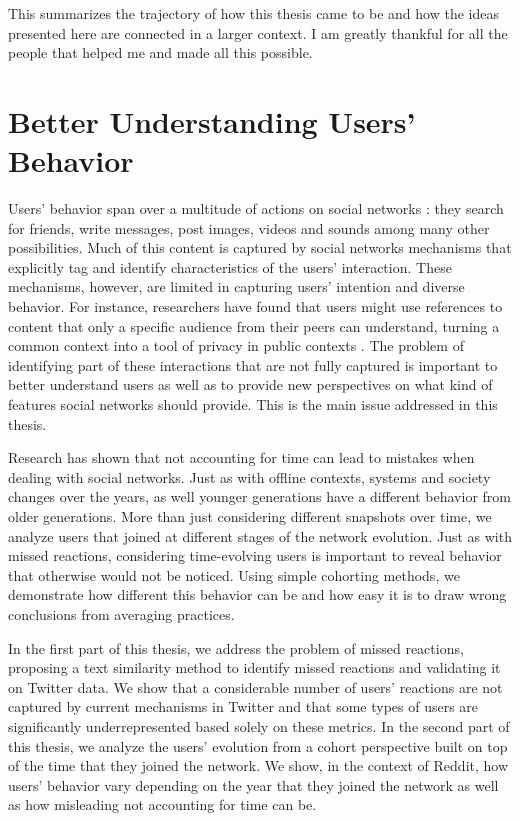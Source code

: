 This summarizes the trajectory of how this thesis came to be and how the ideas presented here are connected in a larger context. I am greatly thankful for all the people that helped me and made all this possible.

\section{Better Understanding Users' Behavior}

Users' behavior span over a multitude of actions on social networks \cite{Benevenuto2009, Gilbert2009, Comarela2012}: they search for friends, write messages, post images, videos and sounds among many other possibilities. Much of this content is captured by social networks mechanisms that explicitly tag and identify characteristics of the users' interaction. These mechanisms, however, are limited in capturing users' intention and diverse behavior. For instance, researchers have found that users might use references to content that only a specific audience from their peers can understand, turning a common context into a tool of privacy in public contexts \cite{Boyd2011}. The problem of identifying part of these interactions that are not fully captured is important to better understand users as well as to provide new perspectives on what kind of features social networks should provide. This is the main issue addressed in this thesis.

Research has shown that not accounting for time can lead to mistakes when dealing with social networks. Just as with offline contexts, systems and society changes over the years, as well younger generations have a different behavior from older generations. More than just considering different snapshots over time, we analyze users that joined at different stages of the network evolution. Just as with missed reactions, considering time-evolving users is important to reveal behavior that otherwise would not be noticed. Using simple cohorting methods, we demonstrate how different this behavior can be and how easy it is to draw wrong conclusions from averaging practices.

In the first part of this thesis, we address the problem of missed reactions, proposing a text similarity method to identify missed reactions and validating it on Twitter data. We show that a considerable number of users' reactions are not captured by current mechanisms in Twitter and that some types of users are significantly underrepresented based solely on these metrics. In the second part of this thesis, we analyze the users' evolution from a cohort perspective built on top of the time that they joined the network. We show, in the context of Reddit, how users' behavior vary depending on the year that they joined the network as well as how misleading not accounting for time can be. 

